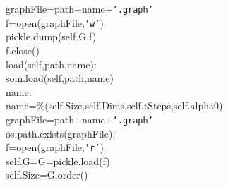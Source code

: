 {{\begin{tabbing}
\hspace{48pt}graphFile\hspace{6pt}=\hspace{6pt}path+name+{\texttt{{'}.graph{'}}}\\
\hspace{48pt}f\hspace{6pt}=\hspace{6pt}open(graphFile,{\texttt{{'}w{'}}})\\
\hspace{48pt}pickle.dump(self.G,f)\\
\hspace{48pt}f.close()\\
\hspace{6pt}load(self,path,name):\\
\hspace{48pt}som.load(self,path,name)\\
\hspace{6pt}name:\\
\hspace{72pt}name\hspace{6pt}=\%(self.Size,self.Dims,self.tSteps,self.alpha0)\\
\hspace{48pt}graphFile\hspace{6pt}=\hspace{6pt}path+name+{\texttt{{'}.graph{'}}}\\
\hspace{6pt}os.path.exists(graphFile):\\
\hspace{72pt}f\hspace{6pt}=\hspace{6pt}open(graphFile,{\texttt{{'}r{'}}})\\
\hspace{72pt}self.G\hspace{6pt}=\hspace{6pt}G\hspace{6pt}=\hspace{6pt}pickle.load(f)\\
\hspace{72pt}self.Size\hspace{6pt}=\hspace{6pt}G.order()\\

\end{tabbing}}}
